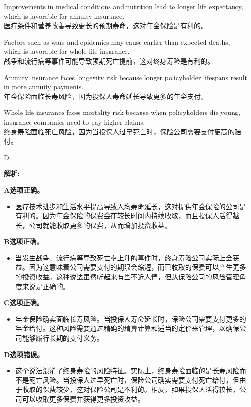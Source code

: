 \documentclass{article}
\newenvironment{explanation}
{\textbf{解析:}\par}
{\par}
\begin{document}
\begin{choices}
    \item Improvements in medical conditions and nutrition lead to longer life expectancy, which is favorable for annuity insurance.\\
    医疗条件和营养改善导致更长的预期寿命，这对年金保险是有利的。
    \item Factors such as wars and epidemics may cause earlier-than-expected deaths, which is favorable for whole life insurance.\\
    战争和流行病等事件可能导致预期死亡提前，这对终身寿险是有利的。
    \item Annuity insurance faces longevity risk because longer policyholder lifespans result in more annuity payments.\\
    年金保险面临长寿风险，因为投保人寿命延长导致更多的年金支付。
    \item Whole life insurance faces mortality risk because when policyholders die young, insurance companies need to pay higher claims.\\
    终身寿险面临死亡风险，因为当投保人过早死亡时，保险公司需要支付更高的赔付。
\end{choices}

\begin{correctanswer}
    D
\end{correctanswer}

\begin{explanation}
    \textbf{A选项正确。}
    \begin{itemize}
        \item 医疗技术进步和生活水平提高导致人均寿命延长，这对提供年金保险的公司是有利的。因为年金保险的保费会在较长时间内持续收取，而且投保人活得越长，公司就能收取更多的保费，从而增加投资收益。
    \end{itemize}

    \textbf{B选项正确。}
    \begin{itemize}
        \item 当发生战争、流行病等导致死亡率上升的事件时，终身寿险公司实际上会获益。因为这意味着公司需要支付的期限会缩短，而已收取的保费可以产生更多的投资收益。这种说法虽然听起来有些不近人情，但从保险公司的风险管理角度来说是正确的。
    \end{itemize}

    \textbf{C选项正确。}
    \begin{itemize}
        \item 年金保险确实面临长寿风险。当投保人寿命延长时，保险公司需要支付更多的年金给付。这种风险需要通过精确的精算计算和适当的定价来管理，以确保公司能够履行长期的支付义务。
    \end{itemize}

    \textbf{D选项错误。}
    \begin{itemize}
        \item 这个说法混淆了终身寿险的风险特征。实际上，终身寿险面临的是长寿风险而不是死亡风险。当投保人过早死亡时，保险公司确实需要支付死亡给付，但由于收取的保费较少，这对保险公司是不利的。相反，如果投保人活得较长，公司可以收取更多保费并获得更多投资收益。
    \end{itemize}
\end{explanation}
\end{document}
